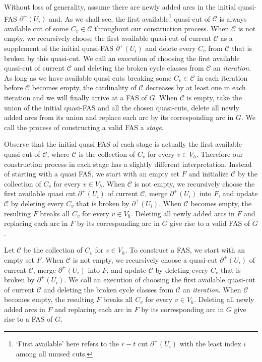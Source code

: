 \documentclass[11pt]{article}
\begin{document}
Without loss of generality, assume there are newly added arcs in the initial quasi-FAS $\partial^+(U_i)$ and. As we shall see, the first available\footnote{`First available' here refers to the $r-t$ cut $\partial^+(U_i)$ with the least index $i$ among all unused cuts.} quasi-cut of $\mathcal{C}$ is always available cut of some $C_v\in\mathcal{C}$ throughout our construction process. When $\mathcal{C}$ is not empty, we recursively choose the first available quasi-cut of current $\mathcal{C}$ as a supplement of the initial quasi-FAS $\partial^+(U_i)$ and delete every $C_v$ from $\mathcal{C}$ that is broken by this quasi-cut. We call an execution of choosing the first available quasi-cut of current $\mathcal{C}$ and deleting the broken cycle classes from $\mathcal{C}$ an \emph{iteration}. As long as we have available quasi cuts breaking some $C_v\in\mathcal{C}$ in each iteration before $\mathcal{C}$ becomes empty, the cardinality of $\mathcal{C}$ decreases by at least one in each iteration and we will finally arrive at a FAS of $G$. When $\mathcal{C}$ is empty, take the union of the initial quasi-FAS and all the chosen quasi-cuts, delete all newly added arcs from its union and replace each arc by its corresponding arc in $G$. We call the process of constructing a valid FAS a \emph{stage}.

Observe that the initial quasi FAS of each stage is actually the first available quasi cut of $\mathcal{C}$, where $\mathcal{C}$ is the collection of $C_v$ for every $v\in V_h$. Therefore our construction process in each stage has a slightly different interpretation. Instead of starting with a quasi FAS, we start with an empty set $F$ and initialize $\mathcal{C}$ by the collection of $C_v$ for every $v\in V_h$. When $\mathcal{C}$ is not empty, we recursively choose the first available quasi cut $\partial^+(U_i)$ of current $\mathcal{C}$, merge $\partial^+(U_i)$ into $F$, and update $\mathcal{C}$ by deleting every $C_v$ that is broken by $\partial^+(U_i)$. When $\mathcal{C}$ becomes empty, the resulting $F$ breaks all $C_v$ for every $v\in V_h$. Deleting all newly added arcs in $F$ and replacing each arc in $F$ by its corresponding arc in $G$ give rise to a valid FAS of $G$.

Let $\mathcal{C}$ be the collection of $C_v$ for $v\in V_h$. To construct a FAS, we start with an empty set $F$. When $\mathcal{C}$ is not empty, we recursively choose a quasi-cut $\partial^+(U_i)$ of current $\mathcal{C}$, merge $\partial^+(U_i)$ into $F$, and update $\mathcal{C}$ by deleting every $C_v$ that is broken by $\partial^+(U_i)$. We call an execution of choosing the first available quasi-cut of current $\mathcal{C}$ and deleting the broken cycle classes from $\mathcal{C}$ an \emph{iteration}. When $\mathcal{C}$ becomes empty, the resulting $F$ breaks all $C_v$ for every $v\in V_h$. Deleting all newly added arcs in $F$ and replacing each arc in $F$ by its corresponding arc in $G$ give rise to a FAS of $G$.
\end{document}
